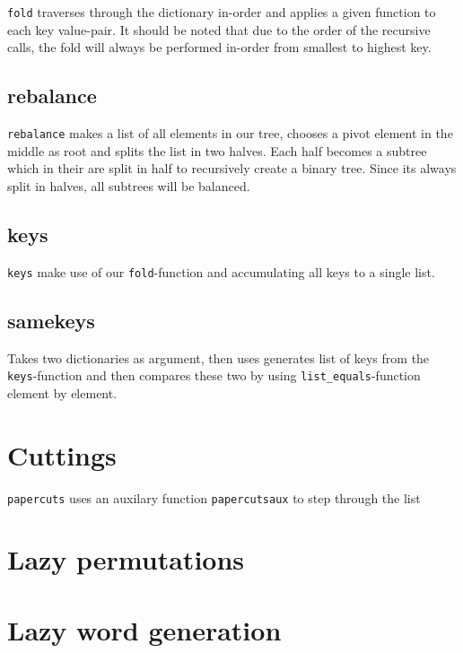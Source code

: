 \documentclass[a4paper,11pt]{article}
\begin{document}
\texttt{fold} traverses through the dictionary in-order and applies a given function to each key value-pair. It should be noted that due to the order of the recursive calls, the fold will always be performed in-order from smallest to highest key.

\subsection{rebalance}

\texttt{rebalance} makes a list of all elements in our tree, chooses a pivot element in the middle as root and splits the list in two halves. Each half becomes a subtree which in their are split in half to recursively create a binary tree. Since its always split in halves, all subtrees will be balanced.

\subsection{keys}

\texttt{keys} make use of our \texttt{fold}-function and accumulating all keys to a single list.

\subsection{samekeys}

Takes two dictionaries as argument, then uses generates list of keys from the \texttt{keys}-function and then compares these two by using \texttt{list\_equals}-function element by element.

\section{Cuttings}

\texttt{papercuts} uses an auxilary function \texttt{papercutsaux} to step through the list

\section{Lazy permutations}

\section{Lazy word generation}
\end{document}
